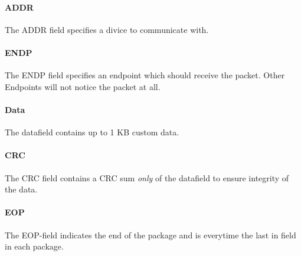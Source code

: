\documentclass{acm_proc_article-sp}
\begin{document}
\paragraph{ADDR}
The ADDR field specifies a divice to communicate with. \cite{beyond}
\paragraph{ENDP}
The ENDP field specifies an endpoint which should receive the packet. Other Endpoints will not notice the packet at all. \cite{beyond}
\paragraph{Data}
The datafield contains up to 1 KB custom data. \cite{beyond}
\paragraph{CRC}
The CRC field contains a CRC sum \emph{only} of the datafield to ensure integrity of the data. \cite{beyond}
\paragraph{EOP}
The EOP-field indicates the end of the package and is everytime the last in field in each package. \cite{beyond}
\end{document}

